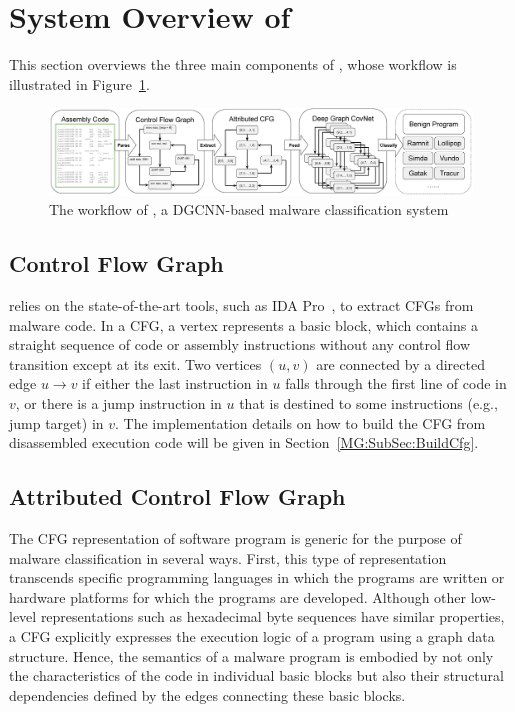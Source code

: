 \section{System Overview of \sysname}
\label{MG:Sec:System}

This section overviews the three main components of \sysname, whose workflow is illustrated in Figure~\ref{MG:Fig:SystemPipeline}.

\begin{figure}[htbp]
    \centerline{\includegraphics[width=1.0\textwidth]{Magic/figures/SystemPipeline.eps}}
    \caption{The workflow of \sysname, a DGCNN-based malware classification system}
    \label{MG:Fig:SystemPipeline}
\end{figure}

\subsection{Control Flow Graph}
\label{MG:Subsec:ConstructCfg}

\sysname relies on the state-of-the-art tools, such as IDA Pro~\cite{bib:idapro}, to extract CFGs from malware code.
In a CFG, a vertex represents a basic block, which contains a straight sequence of code or assembly instructions without any control flow transition except at its exit.
Two vertices $(u, v)$ are connected by a directed edge $u \rightarrow v$ if either the last instruction in $u$ falls through the first line of code in $v$,
or there is a jump instruction in $u$ that is destined to some instructions (e.g., jump target) in $v$.
The implementation details on how to build the CFG from disassembled execution code will be given in Section~\ref{MG:SubSec:BuildCfg}.

\subsection{Attributed Control Flow Graph}
\label{MG:SubSec:Cfg2Acfg}
The CFG representation of software program is generic for the purpose of malware classification in several ways.
First, this type of representation transcends specific programming languages in which the programs are written or hardware platforms for which the programs are developed.
Although other low-level representations such as hexadecimal byte sequences have similar properties, a CFG explicitly expresses the execution logic of a program using a graph data structure.
Hence, the semantics of a malware program is embodied by not only the characteristics of the code in individual basic blocks but also their structural dependencies defined by the edges connecting these basic blocks. 


